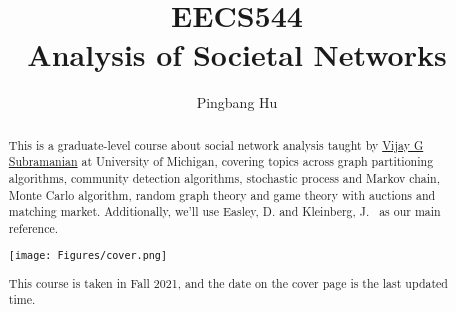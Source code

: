 \documentclass[a4paper]{report}
\author{Pingbang Hu}
\title{EECS544\\Analysis of Societal Networks}
\begin{document}
\maketitle

\begin{abstract}
	This is a graduate-level course about social network analysis taught by \href{https://subramanian.engin.umich.edu/}{Vijay G Subramanian} at University of Michigan, covering topics across graph partitioning algorithms, community detection algorithms, stochastic process and Markov chain, Monte Carlo algorithm, random graph theory and game theory with auctions and matching market. Additionally, we'll use Easley, D. and Kleinberg, J.~\cite{easley2010networks} as our main reference.

	\vfill
	\begin{center}
		\texttt{[image: Figures/cover.png]}
	\end{center}
	\vfill
	This course is taken in Fall 2021, and the date on the cover page is the last updated time.
\end{abstract}

\tableofcontents

\newpage


\newpage
\appendix
\appendixpage{}



\newpage
\pagestyle{plain}
\printbibliography{}
\end{document}

